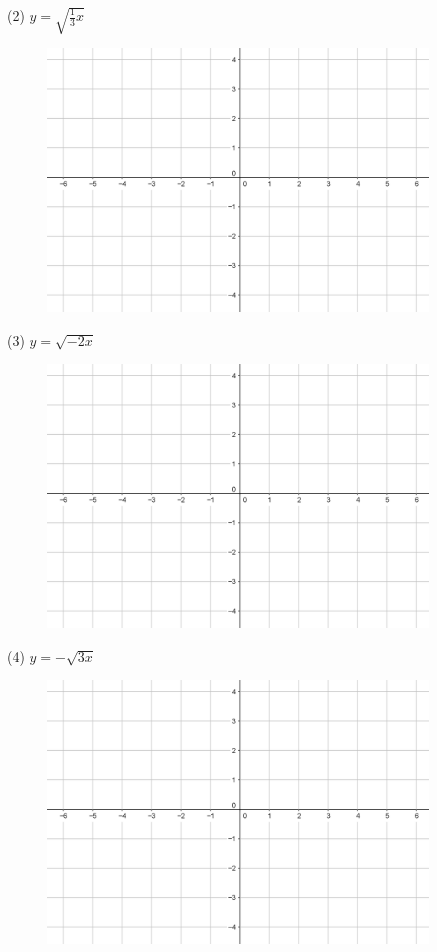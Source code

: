 \documentclass{article}
\begin{document}
(2) \(y=\sqrt{\frac13x}\)
\begin{figure}[h!]
\centering
\includegraphics[width=0.9\textwidth]{irr_2_5}
\end{figure}

\clearpage
(3) \(y=\sqrt{-2x}\)
\begin{figure}[h!]
\centering
\includegraphics[width=0.9\textwidth]{irr_2_5}
\end{figure}

(4) \(y=-\sqrt{3x}\)
\begin{figure}[h!]
\centering
\includegraphics[width=0.9\textwidth]{irr_2_5}
\end{figure}
\end{document}

